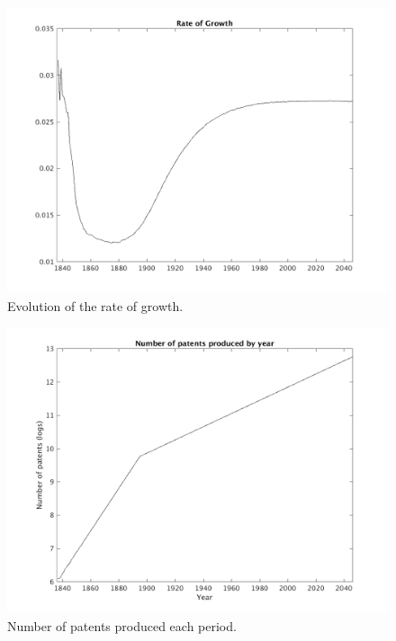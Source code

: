 \documentclass[serif]{article}
\theoremstyle{definition}
\begin{document}
\begin{figure}[h!]
\centering
\includegraphics[width=.75\textwidth]{figures/growth.png}
\caption{Evolution of the rate of growth.}
\end{figure}

\begin{figure}[h!]
\centering
\includegraphics[width=.75\textwidth]{figures/num_pats.png}
\caption{Number of patents produced each period.}
\end{figure}
\end{document}
